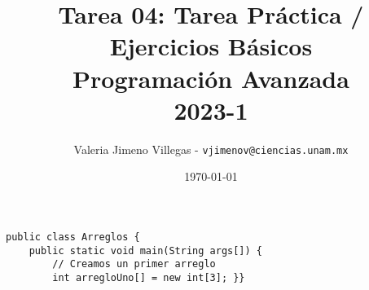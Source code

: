 \documentclass[11pt, oneside]{article}
\title{Tarea 04: Tarea Práctica / Ejercicios Básicos \\[5pt] \normalsize Programación Avanzada  \\[5pt] 2023-1 }
\author{Valeria Jimeno Villegas - \texttt{vjimenov@ciencias.unam.mx}}
\date{\today}
\begin{document}
\maketitle

\begin{verbatim}
public class Arreglos {
	public static void main(String args[]) {
		// Creamos un primer arreglo
		int arregloUno[] = new int[3]; }}
\end{verbatim}
\end{document}
